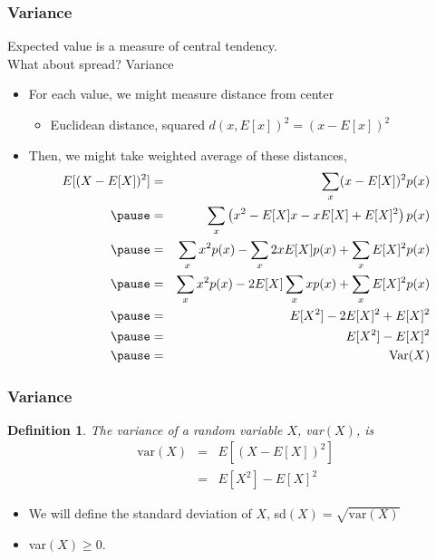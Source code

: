 \documentclass[handout]{beamer}
\newtheorem{defn}{Definition}
\numberwithin{equation}{section}
\begin{document}
\begin{frame}
\frametitle{Variance} 

Expected value is a measure of \alert{central tendency}. \pause \\
What about spread? \pause  \alert{Variance}  \pause \\
\begin{itemize}
\item[-] For each value, we might measure distance from center \pause 
\begin{itemize}
\item[-] Euclidean distance, squared $d(x, E[x])^{2} = (x - E[x])^2$  \pause 
\end{itemize}
\item[-] Then, we might take weighted average of these distances,  \pause 
\tiny{
\begin{eqnarray} 
E[(X - E[X])^2] & = & \sum_{x} (x  - E[X])^2p(x) \nonumber \\  \pause 
& = & \sum_{x} \left(x^2  -E[X] x -x E[X] + E[X]^2\right) p(x) \nonumber \\  \pause 
& = & \sum_{x} x^2 p(x)   - \sum_{x} 2x E[X]p(x) + \sum_{x} E[X]^2 p(x) \nonumber \\  \pause 
& = & \sum_{x} x^2 p(x)   - 2E[X] \sum_{x} x p(x) + \sum_{x} E[X]^2 p(x) \nonumber \\  \pause 
&  = &  E[X^2] - 2E[X]^2 + E[X]^2  \nonumber \\ \pause 
& = & E[X^2] - E[X]^2 \nonumber \\ \pause 
& = & \text{Var}(X) \nonumber 
\end{eqnarray}
}
\end{itemize}

\end{frame}


\begin{frame}
\frametitle{Variance}

\begin{defn}
The variance of a random variable $X$, var$(X)$, is 
\begin{eqnarray}
 \text{var}(X) & = & E[(X - E[X])^2] \nonumber \\
 & = &  E[X^2] - E[X]^2 \nonumber 
\end{eqnarray}
\end{defn}

\begin{itemize}
\item[-] We will define the standard deviation of $X$, sd$(X) = \sqrt{\text{var}(X)} $
\item[-] var$(X) \geq 0$.  
\end{itemize}


\end{frame}
\end{document}
